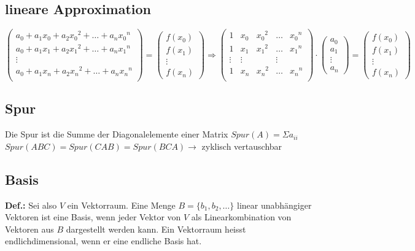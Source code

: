 \subsection{lineare Approximation}
	\begin{equation*}
		\left(\begin{array}{c}
			a_0 + a_1x_0 + a_2{x_0}^2 + \ldots + a_n{x_0}^n\\
			a_0 + a_1x_1 + a_2{x_1}^2 + \ldots + a_n{x_1}^n\\
			\vdots \\
			a_0 + a_1x_n + a_2{x_n}^2 + \ldots + a_n{x_n}^n\\
		\end{array}\right) = \left(\begin{array}{c}
			f(x_0)\\
			f(x_1)\\
			\vdots\\
			f(x_n)
		\end{array}\right) \Rightarrow \left(\begin{array}{ccccc}
			1 & x_0 & {x_0}^2 & \ldots & {x_0}^n\\
			1 & x_1 & {x_1}^2 & \ldots & {x_1}^n\\
			\vdots & \vdots & & \vdots \\
			1 & x_n & {x_n}^2 & \ldots & {x_n}^n\\
		\end{array}\right) \cdot \left(\begin{array}{c}
			a_0\\
			a_1\\
			\vdots \\
			a_n
		\end{array}\right) = \left(\begin{array}{c}
			f(x_0)\\
			f(x_1)\\
			\vdots \\
			f(x_n)
		\end{array}\right)
	\end{equation*}

\subsection{Spur}
	Die Spur ist die Summe der Diagonalelemente einer Matrix $Spur(A) = \Sigma a_{ii}$\\
	$Spur(ABC) = Spur(CAB) = Spur(BCA) \rightarrow$ zyklisch vertauschbar


\subsection{Basis}
	\textbf{Def.:} Sei also $V$ ein Vektorraum. Eine Menge $B = \lbrace b_1, b_2, \ldots \rbrace$ linear unabhängiger Vektoren
	ist eine Basis, wenn jeder Vektor von $V$ als Linearkombination von Vektoren aus $B$ dargestellt werden kann. Ein 
	Vektorraum heisst endlichdimensional, wenn er eine endliche Basis hat. 

